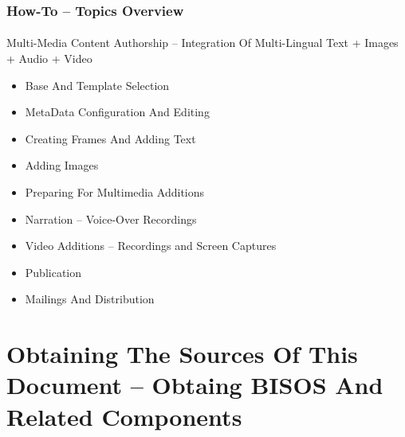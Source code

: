 \begin{frame}[fragile,label=How-To--TopicsOverview]
    \frametitle{How-To -- Topics Overview}
    \framesubtitle{}

Multi-Media Content Authorship -- Integration Of Multi-Lingual Text + Images + Audio + Video 

\begin{itemize}
\item Base And Template Selection
\item MetaData Configuration And Editing
\item Creating Frames And Adding Text
\item Adding Images
\item Preparing For Multimedia Additions
\item Narration -- Voice-Over Recordings
\item Video Additions -- Recordings and Screen Captures
\item Publication
\item Mailings And Distribution
\end{itemize}

\end{frame}


\begin{comment}
*  [[elisp:(org-cycle)][| ]] [[elisp:(org-show-subtree)][|=]] [[elisp:(show-children 10)][|V]] [[elisp:(bx:orgm:indirectBufOther)][|>]] [[elisp:(bx:orgm:indirectBufMain)][|I]] [[elisp:(blee:ppmm:org-mode-toggle)][|N]] [[elisp:(org-top-overview)][|O]] [[elisp:(progn (org-shifttab) (org-content))][|C]] [[elisp:(delete-other-windows)][|1]]  /Section/   Obtaining The Sources Of This Document -- Obtaing BISOS And Related Components ::  [[elisp:(org-cycle)][| ]]
\end{comment}

\section{Obtaining The Sources Of This Document -- Obtaing BISOS And Related Components}

\begin{comment}
**  [[elisp:(org-cycle)][| ]] [[elisp:(org-show-subtree)][|=]] [[elisp:(show-children 10)][|V]] [[elisp:(bx:orgm:indirectBufOther)][|>]] [[elisp:(bx:orgm:indirectBufMain)][|I]] [[elisp:(blee:ppmm:org-mode-toggle)][|N]] [[elisp:(org-top-overview)][|O]] [[elisp:(progn (org-shifttab) (org-content))][|C]] [[elisp:(delete-other-windows)][|1]]  /Subsection/   Obtaining Source Of This Document -- Pointers To Git Repos ::  [[elisp:(org-cycle)][| ]]
\end{comment}

